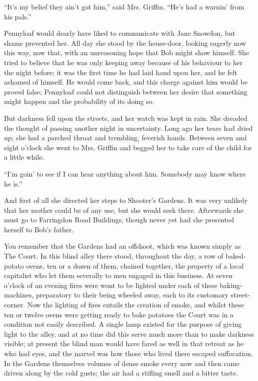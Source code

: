 ``It's my belief they ain't got him,'' said Mrs. Griffin. ``He's had a
warnin' from his pals.''

Pennyloaf would dearly have liked to communicate with Jane Snowdon, but
shame prevented her. All day she stood by the house-door, looking
eagerly now this way, now that, with an unreasoning hope that Bob might
show himself. She tried to believe that he was only keeping away because
of his behaviour to her the night before; it was the first time he had
laid hand upon her, and he felt ashamed of himself. He would come back,
and this charge against him would be proved false; Pennyloaf could not
distinguish between her desire that something might happen and the
probability of its doing so.

But darkness fell upon the streets, and her {}watch was kept in rain.
She dreaded the thought of passing another night in uncertainty. Long
ago her tears had dried up; she had a parched throat and trembling,
feverish hands. Between seven and eight o'clock she went to Mrs. Griffin
and begged her to take care of the child for a little while.

``I'm goin' to see if I can hear anything about him. Somebody may know
where he is.''

And first of all she directed her steps to Shooter's Gardens. It was
very unlikely that her mother could be of any use, but she would seek
there. Afterwards she must go to Farringdon Road Buildings, though never
yet had she presented herself to Bob's father.

You remember that the Gardens had an offshoot, which was known simply as
The Court. In this blind alley there stood, throughout the day, a row of
baked-potato ovens, ten or a dozen of them, chained together, the
property of a local capitalist who let them severally to men engaged in
this business. At seven o'clock of an evening fires were wont to be
lighted under each of these baking-machines, preparatory to their being
wheeled away, each to its customary {}street-corner. Now the lighting of
fires entails the creation of smoke, and whilst these ten or twelve
ovens were getting ready to bake potatoes the Court was in a condition
not easily described. A single lamp existed for the purpose of giving
light to the alley, and at no time did this serve much more than to make
darkness visible; at present the blind man would have fared as well in
that retreat as he who had eyes, and the marvel was how those who lived
there escaped suffocation. In the Gardens themselves volumes of dense
smoke every now and then came driven along by the cold gusts; the air
had a stifling smell and a bitter taste.

